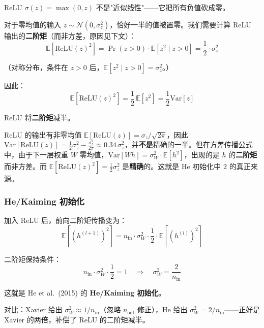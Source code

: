 \documentclass[12pt, a4paper]{ctexart}
\begin{document}
ReLU $\sigma(z) = \max(0, z)$ 不是"近似线性"——它把所有负值砍成零。

对于零均值的输入 $z \sim \mathcal{N}(0, \sigma_z^2)$，恰好一半的值被置零。我们需要计算 ReLU 输出的\textbf{二阶矩}（而非方差，原因见下文）：
\begin{equation}
    \mathbb{E}[\text{ReLU}(z)^2] = \Pr(z > 0) \cdot \mathbb{E}[z^2 \mid z > 0] = \frac{1}{2} \cdot \sigma_z^2 
\end{equation}

（对称分布，条件在 $z > 0$ 后，$\mathbb{E}[z^2 \mid z > 0] = \sigma_z^2$。）

因此：
\begin{equation}
    \boxed{\mathbb{E}[\text{ReLU}(z)^2] = \frac{1}{2}\,\mathbb{E}[z^2] = \frac{1}{2}\text{Var}[z]}
\end{equation}

ReLU 将\textbf{二阶矩}减半。

ReLU 的输出有非零均值 $\mathbb{E}[\text{ReLU}(z)] = \sigma_z / \sqrt{2\pi}$，因此 $\text{Var}[\text{ReLU}(z)] = \frac{1}{2}\sigma_z^2 - \frac{\sigma_z^2}{2\pi} \approx 0.34\,\sigma_z^2$，并\textbf{不是}精确的一半。但在方差传播公式中，由于下一层权重 $W$ 零均值，$\text{Var}[Wh] = \sigma_W^2 \cdot \mathbb{E}[h^2]$，出现的是 $h$ 的\textbf{二阶矩}而非方差。而 $\mathbb{E}[\text{ReLU}(z)^2] = \frac{1}{2}\sigma_z^2$ 是\textbf{精确}的。这就是 He 初始化中 $2$ 的真正来源。

\subsubsection{He/Kaiming 初始化}

加入 ReLU 后，前向二阶矩传播变为：
\begin{equation}
    \mathbb{E}[(h^{(l+1)})^2] = n_{\text{in}} \cdot \sigma_W^2 \cdot \frac{1}{2} \cdot \mathbb{E}[(h^{(l)})^2]
\end{equation}

二阶矩保持条件：
\begin{equation}
    n_{\text{in}} \cdot \sigma_W^2 \cdot \frac{1}{2} = 1 \quad \Rightarrow \quad \boxed{\sigma_W^2 = \frac{2}{n_{\text{in}}}}
\end{equation}

这就是 He et al.\ (2015) 的 \textbf{He/Kaiming 初始化}。

对比：Xavier 给出 $\sigma_W^2 \approx 1/n_{\text{in}}$（忽略 $n_{\text{out}}$ 修正），He 给出 $\sigma_W^2 = 2/n_{\text{in}}$——正好是 Xavier 的两倍，补偿了 ReLU 的二阶矩减半。
\end{document}
